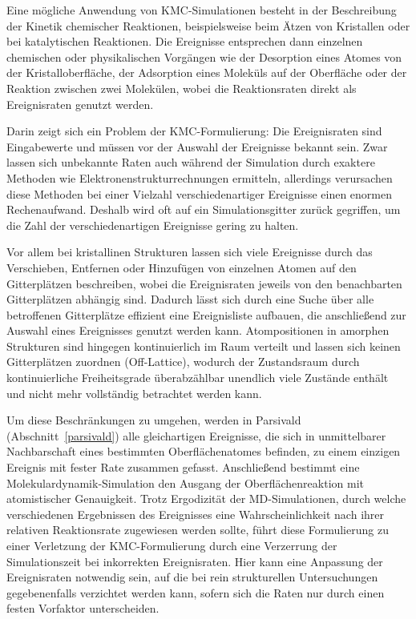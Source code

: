 Eine mögliche Anwendung von KMC-Simulationen besteht in der Beschreibung der Kinetik chemischer Reaktionen, beispielsweise beim Ätzen von Kristallen\cite{gosalvez_atomistic_2008} oder bei katalytischen Reaktionen\cite{stamatakis_unraveling_2012}.
Die Ereignisse entsprechen dann einzelnen chemischen oder physikalischen Vorgängen wie der Desorption eines Atomes von der Kristalloberfläche, der Adsorption eines Moleküls auf der Oberfläche oder der Reaktion zwischen zwei Molekülen, wobei die Reaktionsraten direkt als Ereignisraten genutzt werden.

Darin zeigt sich ein Problem der KMC-Formulierung:
Die Ereignisraten sind Eingabewerte und müssen vor der Auswahl der Ereignisse bekannt sein.
Zwar lassen sich unbekannte Raten auch während der Simulation durch exaktere Methoden wie Elektronenstrukturrechnungen ermitteln\cite{stamatakis_unraveling_2012}, allerdings verursachen diese Methoden bei einer Vielzahl verschiedenartiger Ereignisse einen enormen Rechenaufwand.
Deshalb wird oft auf ein Simulationsgitter zurück gegriffen, um die Zahl der verschiedenartigen Ereignisse gering zu halten.

Vor allem bei kristallinen Strukturen lassen sich viele Ereignisse durch das Verschieben, Entfernen oder Hinzufügen von einzelnen Atomen auf den Gitterplätzen beschreiben, wobei die Ereignisraten jeweils von den benachbarten Gitterplätzen abhängig sind.
Dadurch lässt sich durch eine Suche über alle betroffenen Gitterplätze effizient eine Ereignisliste aufbauen, die anschließend zur Auswahl eines Ereignisses genutzt werden kann.
Atompositionen in amorphen Strukturen sind hingegen kontinuierlich im Raum verteilt und lassen sich keinen Gitterplätzen zuordnen (Off-Lattice), wodurch der Zustandsraum durch kontinuierliche Freiheitsgrade überabzählbar unendlich viele Zustände enthält und nicht mehr vollständig betrachtet werden kann.

Um diese Beschränkungen zu umgehen, werden in Parsivald (Abschnitt~\ref{parsivald}) alle gleichartigen Ereignisse, die sich in unmittelbarer Nachbarschaft eines bestimmten Oberflächenatomes befinden, zu einem einzigen Ereignis mit fester Rate zusammen gefasst.
Anschließend bestimmt eine Molekulardynamik-Simulation den Ausgang der Oberflächenreaktion mit atomistischer Genauigkeit.
Trotz Ergodizität der MD-Simulationen, durch welche verschiedenen Ergebnissen des Ereignisses eine Wahrscheinlichkeit nach ihrer relativen Reaktionsrate zugewiesen werden sollte, führt diese Formulierung zu einer Verletzung der KMC-Formulierung durch eine Verzerrung der Simulationszeit bei inkorrekten Ereignisraten.
Hier kann eine Anpassung der Ereignisraten notwendig sein, auf die bei rein strukturellen Untersuchungen gegebenenfalls verzichtet werden kann, sofern sich die Raten nur durch einen festen Vorfaktor unterscheiden.

